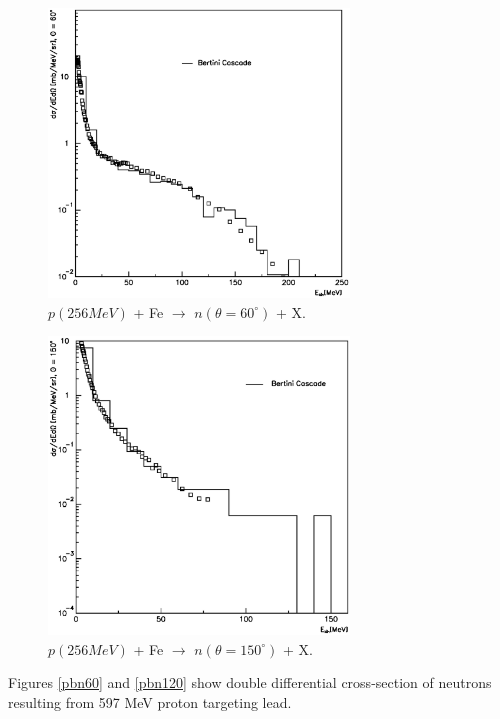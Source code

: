 \documentclass[twocolumn,twoside,slac]{revtex4}
\begin{document}
\begin{figure}
  \includegraphics[width=80mm,keepaspectratio]{pn_fe_256_n_a2.eps}
  \caption{$p(256 MeV)$ + Fe $\rightarrow$ $n(\theta = 60^{\circ})$ + X.}
  \label{n60}
\end{figure}


\begin{figure}
  \includegraphics[width=80mm,keepaspectratio]{pn_fe_256_n_a4.eps}
  \caption{$p(256 MeV)$ + Fe $\rightarrow$ $n(\theta = 150^{\circ})$ + X.}
  \label{n150}
\end{figure}




Figures \ref{pbn60} and \ref{pbn120} show double differential cross-section of neutrons resulting from 597 MeV proton targeting lead. 
\end{document}
